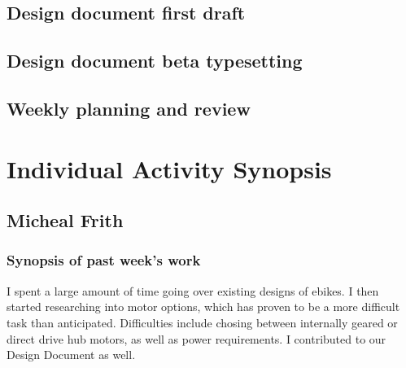 \documentclass[12pt,article,compsoc]{IEEEtran}
\begin{document}
	\subsection{Design document first draft}
	
	\subsection{Design document beta typesetting}
	
	\subsection{Weekly planning and review }
	
\section{Individual Activity Synopsis}
	\subsection{Micheal Frith}

	\subsubsection*{Synopsis of past week's work}
        I spent a large amount of time going over existing designs of ebikes. I then started researching into motor options, 
        which has proven to be a more difficult task than anticipated. Difficulties include chosing between internally geared 
        or direct drive hub motors, as well as power requirements. I contributed to our Design Document as well.
	
\end{document}
